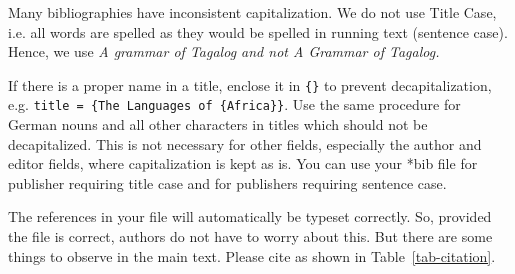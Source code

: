 Many bibliographies have inconsistent capitalization. We do not use Title Case, i.e. all words are spelled as they would be spelled in running text (sentence case). Hence, we use \em A grammar of Tagalog \em and not \em A Grammar of Tagalog\em. 

If there is a proper name in a title, enclose it in \verb+{}+ to prevent decapitalization, e.g. \verb+title = {The Languages of {Africa}}+. Use the same procedure for German nouns and all other characters in titles which should not be decapitalized. This is not necessary for other fields, especially the author and editor fields, where capitalization is kept as is. You can use your *bib file for publisher requiring title case and for publishers requiring sentence case.


The references in your \BibTeX\xspace file will automatically be typeset correctly. So, provided the
\BibTeX\xspace file is correct, authors do not have to worry about this. But there are some things to
observe in the main text. Please cite as shown in Table~\ref{tab-citation}.

